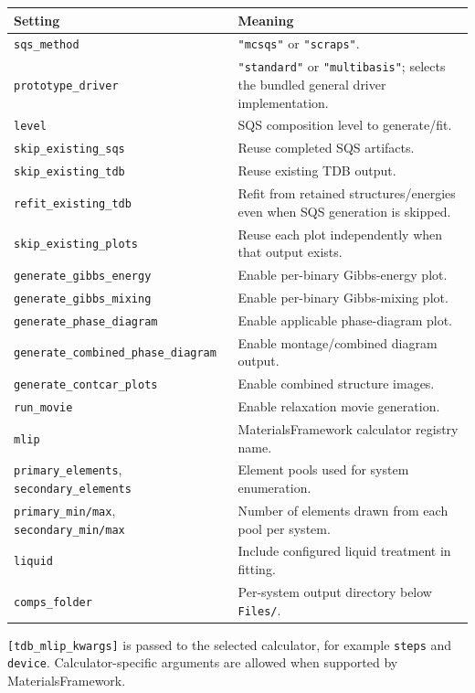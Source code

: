 \documentclass[11pt,letterpaper]{article}
\newcommand{\file}[1]{\nolinkurl{#1}}
\newcommand{\setting}[1]{\nolinkurl{#1}}
\begin{document}
\begin{longtable}{p{}p{}}
\toprule
Setting & Meaning \\
\midrule
\endhead
\setting{sqs_method} & \file{"mcsqs"} or \file{"scraps"}. \\
\setting{prototype_driver} & \file{"standard"} or \file{"multibasis"}; selects the bundled general driver implementation. \\
\setting{level} & SQS composition level to generate/fit. \\
\setting{skip_existing_sqs} & Reuse completed SQS artifacts. \\
\setting{skip_existing_tdb} & Reuse existing TDB output. \\
\setting{refit_existing_tdb} & Refit from retained structures/energies even when SQS generation is skipped. \\
\setting{skip_existing_plots} & Reuse each plot independently when that output exists. \\
\setting{generate_gibbs_energy} & Enable per-binary Gibbs-energy plot. \\
\setting{generate_gibbs_mixing} & Enable per-binary Gibbs-mixing plot. \\
\setting{generate_phase_diagram} & Enable applicable phase-diagram plot. \\
\setting{generate_combined_phase_diagram} & Enable montage/combined diagram output. \\
\setting{generate_contcar_plots} & Enable combined structure images. \\
\setting{run_movie} & Enable relaxation movie generation. \\
\setting{mlip} & MaterialsFramework calculator registry name. \\
\setting{primary_elements}, \setting{secondary_elements} & Element pools used for system enumeration. \\
\setting{primary_min/max}, \setting{secondary_min/max} & Number of elements drawn from each pool per system. \\
\setting{liquid} & Include configured liquid treatment in fitting. \\
\setting{comps_folder} & Per-system output directory below \file{Files/}. \\
\bottomrule
\end{longtable}

\setting{[tdb_mlip_kwargs]} is passed to the selected calculator, for example
\setting{steps} and \setting{device}. Calculator-specific arguments are
allowed when supported by MaterialsFramework.
\end{document}
